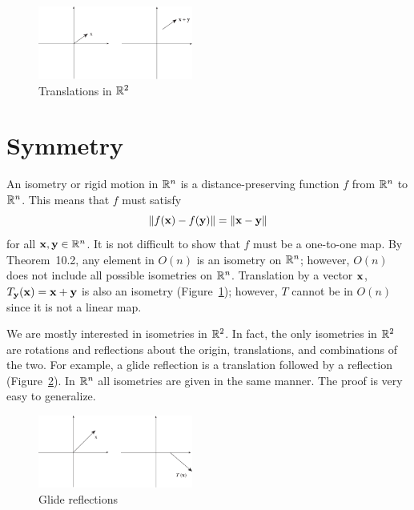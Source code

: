  
 
 
\begin{figure}[hbt]
\begin{center}
\centerline {
\includegraphics[width=2in]{Isometries}
}
\end{center}
\caption{Translations in ${\Bbb R}^2$}
\label{Isometries}
\end{figure}
 
 
 
 
 
\section{Symmetry}
 
 
 
 
An {\bfi isometry\/} or {\bfi rigid
motion\/} in ${\Bbb R}^n$  is a
distance-preserving function $f$ from ${\Bbb R}^n$ to ${\Bbb R}^n$.
This means that $f$ must satisfy 
\[
\| f({\bold x}) - f({\bold y}) \| =
\|{\bold x} - {\bold y} \|
\]
for all ${\bold x}, {\bold y} \in {\Bbb R}^n$. It is not difficult to
show that $f$ must be a one-to-one map. By Theorem~10.2, any element in
$O(n)$ is an isometry on ${\Bbb R}^n$; however, $O(n)$ does not
include all possible isometries on ${\Bbb R}^n$. Translation by a
vector ${\bold x}$, $T_{\bold y}({\bold x}) = {\bold x} + {\bold y}$
is also an isometry (Figure~\ref{Isometries}); however, $T$ cannot be
in $O(n)$ since it is not a linear map. 
 
 
 
We are mostly interested in isometries in ${\Bbb R}^2$. In fact, the
only isometries in ${\Bbb R}^2$ are rotations and reflections  about
the origin, translations, and combinations of the two. For example, a
{\bfi glide reflection\/} is a translation
followed by a reflection (Figure~\ref{Glide}).   In ${\Bbb R}^n$ all
isometries are given in the same manner. The proof is very easy to
generalize. 
 
 
\begin{figure}[htb]
\begin{center}
\centerline {
\includegraphics[width=2in]{Glide}
}
\end{center}
\caption{Glide reflections}
\label{Glide}
\end{figure}
 
